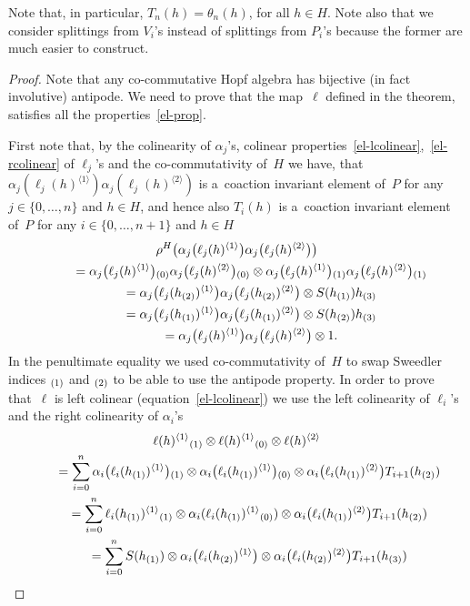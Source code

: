 \documentclass[11pt]{article}
\def\sw#1{{\sb{(#1)}}}
\newcommand{\ls}[1]{\ell(#1)^{\langle 1\rangle}}
\newcommand{\rs}[1]{\ell(#1)^{\langle 2\rangle}}
\newcommand{\lls}[2]{\ell_{#1}(#2)^{\langle 1\rangle}}
\newcommand{\rrs}[2]{\ell_{#1}(#2)^{\langle 2\rangle}}
\begin{document}
Note that, in particular, $T_n(h)=\theta_n(h)$, for all $h\in H$.
Note also that we consider splittings from $V_i$'s instead of splittings from $P_i$'s because the former are much easier
to construct.
\begin{proof}
Note that any co-commutative Hopf algebra has bijective (in fact involutive) antipode.
We need to prove that the map~$\ell$ def\/ined in the theorem, satisf\/ies all the properties~\eqref{el-prop}.

First note that, by the colinearity of $\alpha_j$'s, colinear properties~\eqref{el-lcolinear},~\eqref{el-rcolinear} of
$\ell_j$'s and the co-commutativity of~$H$ we have, that $\alpha_j(\lls{j}{h})\alpha_{j}(\rrs{j}{h})$ is a~coaction
invariant element of~$P$ for any $j\in\{0,\ldots,n\}$ and $h\in H$, and hence also $T_i(h)$ is a~coaction invariant
element of~$P$ for any $i\in\{0,\ldots,n+1\}$ and $h\in H$
\begin{gather*}
\rho^H\big(\alpha_j\big(\lls{j}{h}\big)\alpha_{j}\big(\rrs{j}{h}\big)\big)\\
\qquad{}
=\alpha_j\big(\lls{j}{h}\big)\sw{0}\alpha_{j}\big(\rrs{j}{h}\big)\sw{0} \otimes
\alpha_j\big(\lls{j}{h}\big)\sw{1}\alpha_{j}\big(\rrs{j}{h}\big)\sw{1}
\\
\qquad{}
 =\alpha_j\big(\lls{j}{h\sw{2}}\big)\alpha_{j}\big(\rrs{j}{h\sw{2}}\big)\otimes S(h\sw{1})h\sw{3}
\\
\qquad{}
 =\alpha_j\big(\lls{j}{h\sw{1}}\big)\alpha_{j}\big(\rrs{j}{h\sw{1}}\big)\otimes S(h\sw{2})h\sw{3}\\
 \qquad{}
 =\alpha_j\big(\lls{j}{h}\big)\alpha_{j}\big(\rrs{j}{h}\big)\otimes1.
\end{gather*}
In the penultimate equality we used co-commutativity of~$H$ to swap Sweedler indices $\sw{1}$ and $\sw{2}$ to be able to
use the antipode property.
In order to prove that~$\ell$ is left colinear (equation~\eqref{el-lcolinear}) we use the left colinearity of $\ell_i$'s
and the right colinearity of $\alpha_i$'s
\begin{gather*}
\ls{h}\sw{1}\otimes\ls{h}\sw{0}\otimes\rs{h}
\\
\qquad=
\sum\limits_{i=0}^n\alpha_i\big(\lls{i}{h\sw{1}}\big)\sw{1}\otimes\alpha_i\big(\lls{i}{h\sw{1}}\big)\sw{0}
\otimes\alpha_i\big(\rrs{i}{h\sw{1}}\big)T_{i+1}(h\sw{2})
\\
\qquad=
\sum\limits_{i=0}^n\lls{i}{h\sw{1}}\sw{1}\otimes\alpha_i(\lls{i}{h\sw{1}}\sw{0})
\otimes\alpha_i\big(\rrs{i}{h\sw{1}}\big)T_{i+1}(h\sw{2})
\\
\qquad=
\sum\limits_{i=0}^nS(h\sw{1})\otimes\alpha_i\big(\lls{i}{h\sw{2}}\big) \otimes\alpha_i\big(\rrs{i}{h\sw{2}}\big)T_{i+1}(h\sw{3})

\end{gather*}
\end{proof}
\end{document}
